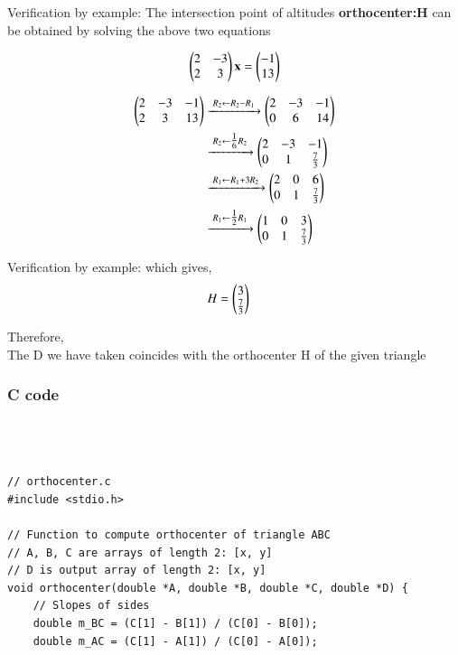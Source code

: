 \documentclass{beamer}
\begin{document}
\begin{frame}{Verification by example:}
The intersection point of altitudes \textbf{orthocenter:H} can be obtained by solving the above two equations

\begin{align}
\begin{pmatrix}2 & -3 \\ 2 & 3\end{pmatrix}\mathbf{x} = \begin{pmatrix}-1 \\ 13\end{pmatrix}
\end{align}

\begin{align}
\begin{pmatrix}2 & -3 & -1 \\ 2 & 3 & 13\end{pmatrix}
&\xrightarrow{\;R_2 \gets R_2 - R_1\;}
\begin{pmatrix}2 & -3 & -1 \\ 0 & 6 & 14\end{pmatrix} \\
&\xrightarrow{\;R_2 \gets \tfrac{1}{6}R_2\;}
\begin{pmatrix}2 & -3 & -1 \\ 0 & 1 & \tfrac{7}{3}\end{pmatrix} \\
&\xrightarrow{\;R_1 \gets R_1 + 3R_2\;}
\begin{pmatrix}2 & 0 & 6 \\ 0 & 1 & \tfrac{7}{3}\end{pmatrix} \\
&\xrightarrow{\;R_1 \gets \tfrac{1}{2}R_1\;}
\begin{pmatrix}1 & 0 & 3 \\ 0 & 1 & \tfrac{7}{3}\end{pmatrix}
\end{align}
\end{frame}
\begin{frame}{Verification by example:}
which gives,
\begin{align}
H&=\begin{pmatrix}3\\\tfrac{7}{3}\end{pmatrix}
\end{align}

Therefore,\\
The D we have taken coincides with the orthocenter H of the given triangle
\end{frame}
\begin{frame}[fragile]
    \frametitle{C code}
    \begin{lstlisting}



// orthocenter.c
#include <stdio.h>

// Function to compute orthocenter of triangle ABC
// A, B, C are arrays of length 2: [x, y]
// D is output array of length 2: [x, y]
void orthocenter(double *A, double *B, double *C, double *D) {
    // Slopes of sides
    double m_BC = (C[1] - B[1]) / (C[0] - B[0]);
    double m_AC = (C[1] - A[1]) / (C[0] - A[0]);
\end{lstlisting}
 
\end{frame}
\end{document}
